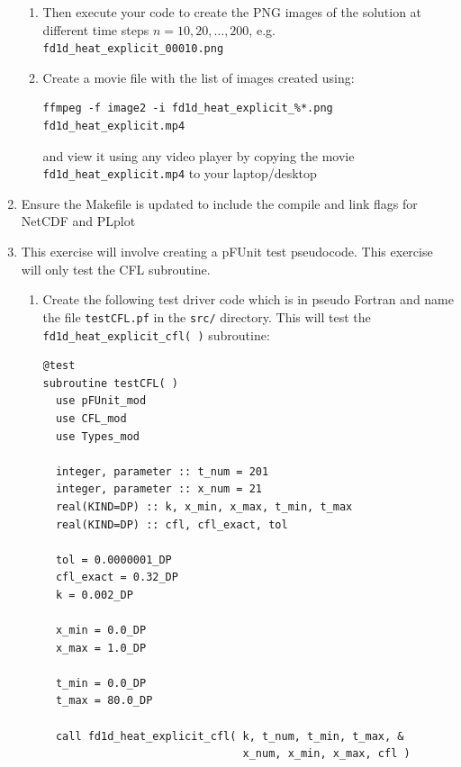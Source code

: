 \documentclass[12pt]{article}
\begin{document}
\begin{enumerate}
\begin{enumerate}
\item Then execute your code to create the PNG images of the solution at
  different time steps $n = 10,20,\ldots, 200$, e.g.
  \texttt{fd1d\_heat\_explicit\_00010.png}
\item Create a movie file with the list of images created using:
\begin{verbatim}
ffmpeg -f image2 -i fd1d_heat_explicit_%*.png fd1d_heat_explicit.mp4
\end{verbatim}
and view it using any video player by copying the movie \texttt{fd1d\_heat\_explicit.mp4} to your
laptop/desktop
\end{enumerate}
\item Ensure the Makefile is updated to include the compile and link flags for NetCDF and PLplot
\item This exercise will involve creating a pFUnit test pseudocode. This exercise will only
test the CFL subroutine. 
\begin{enumerate}
\item Create the following test driver code which is in pseudo Fortran and name the file \texttt{testCFL.pf}
  in the \texttt{src/} directory. This will test the \texttt{fd1d\_heat\_explicit\_cfl( )} subroutine:
\begin{verbatim}
@test
subroutine testCFL( )
  use pFUnit_mod
  use CFL_mod
  use Types_mod

  integer, parameter :: t_num = 201
  integer, parameter :: x_num = 21
  real(KIND=DP) :: k, x_min, x_max, t_min, t_max 
  real(KIND=DP) :: cfl, cfl_exact, tol

  tol = 0.0000001_DP
  cfl_exact = 0.32_DP
  k = 0.002_DP

  x_min = 0.0_DP
  x_max = 1.0_DP

  t_min = 0.0_DP
  t_max = 80.0_DP
  
  call fd1d_heat_explicit_cfl( k, t_num, t_min, t_max, &
                               x_num, x_min, x_max, cfl )


\end{verbatim}
\end{enumerate}
\end{enumerate}
\end{document}
